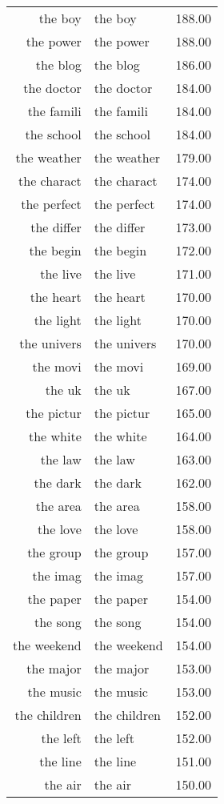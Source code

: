 \begin{table}[ht]
\begin{tabular}{rlr}
  the boy & the boy & 188.00 \\ 
  the power & the power & 188.00 \\ 
  the blog & the blog & 186.00 \\ 
  the doctor & the doctor & 184.00 \\ 
  the famili & the famili & 184.00 \\ 
  the school & the school & 184.00 \\ 
  the weather & the weather & 179.00 \\ 
  the charact & the charact & 174.00 \\ 
  the perfect & the perfect & 174.00 \\ 
  the differ & the differ & 173.00 \\ 
  the begin & the begin & 172.00 \\ 
  the live & the live & 171.00 \\ 
  the heart & the heart & 170.00 \\ 
  the light & the light & 170.00 \\ 
  the univers & the univers & 170.00 \\ 
  the movi & the movi & 169.00 \\ 
  the uk & the uk & 167.00 \\ 
  the pictur & the pictur & 165.00 \\ 
  the white & the white & 164.00 \\ 
  the law & the law & 163.00 \\ 
  the dark & the dark & 162.00 \\ 
  the area & the area & 158.00 \\ 
  the love & the love & 158.00 \\ 
  the group & the group & 157.00 \\ 
  the imag & the imag & 157.00 \\ 
  the paper & the paper & 154.00 \\ 
  the song & the song & 154.00 \\ 
  the weekend & the weekend & 154.00 \\ 
  the major & the major & 153.00 \\ 
  the music & the music & 153.00 \\ 
  the children & the children & 152.00 \\ 
  the left & the left & 152.00 \\ 
  the line & the line & 151.00 \\ 
  the air & the air & 150.00 \\ 

\end{tabular}
\end{table}
